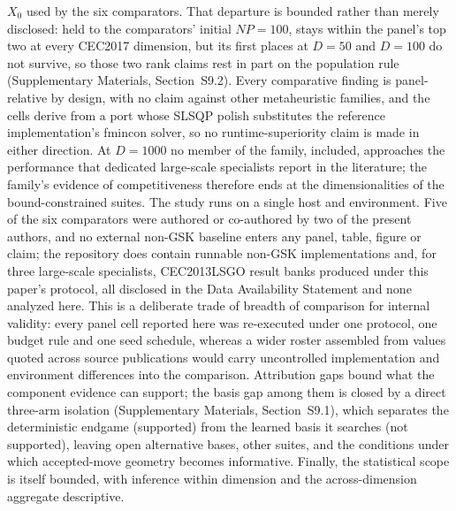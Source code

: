$X_{0}$ used by the six comparators. That departure is bounded rather than
merely disclosed: held to the comparators' initial $NP = 100$, \dtgsk{}
stays within the panel's top two at every CEC2017 dimension, but its first
places at $D = 50$ and $D = 100$ do not survive, so those two rank claims
rest in part on the population rule (Supplementary Materials,
Section~S9.2).
Every comparative finding is panel-relative by design, with no claim against
other metaheuristic families, and the \egsk{} cells derive from a port whose
SLSQP polish substitutes the reference implementation's fmincon solver, so no
runtime-superiority claim is made in either direction. At $D = 1000$ no
member of the family, \dtgsk{} included, approaches the performance that
dedicated large-scale specialists report in the literature; the family's
evidence of competitiveness therefore ends at the dimensionalities of the
bound-constrained
suites. %
The study runs on a single host and environment. Five of the six
comparators were authored or co-authored by two of the present authors, and no
external non-GSK baseline enters any panel, table, figure or claim;
the repository does contain runnable non-GSK implementations and, for
three large-scale specialists, CEC2013LSGO result banks produced under
this paper's protocol, all disclosed in the Data Availability Statement
and none analyzed
here. %
This is a deliberate trade of breadth of
comparison for internal validity: every panel cell reported here was re-executed
under one protocol, one budget rule and one seed schedule, whereas a wider
roster assembled from values quoted across source publications would carry
uncontrolled implementation and environment differences into the comparison. Attribution gaps bound what the
component evidence can support; the basis gap among them is closed by a
direct three-arm isolation (Supplementary Materials, Section~S9.1), which
separates the deterministic endgame
(supported) from the learned basis it searches (not supported), leaving open
alternative bases, other suites, and the conditions under which accepted-move
geometry becomes informative. Finally, the
statistical scope is itself bounded, with inference within dimension and the
across-dimension aggregate descriptive.

